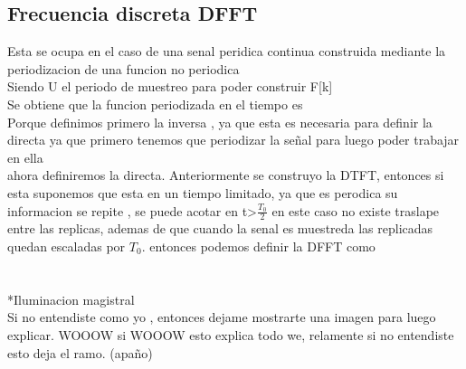 \subsection{ Frecuencia discreta DFFT}
Esta se ocupa en el caso de una senal peridica continua construida mediante la periodizacion de una funcion no periodica 
\\ Siendo U el periodo de muestreo para poder construir F[k]
\\ Se obtiene que la funcion periodizada en el tiempo es 
\\ Porque definimos primero la inversa , ya que esta es necesaria para definir la directa ya que primero tenemos que periodizar la señal para luego poder trabajar en ella
\\ ahora definiremos la directa. Anteriormente se construyo la DTFT, entonces si esta suponemos que esta en un tiempo limitado, ya que es perodica su informacion se repite , se puede acotar en t>$\frac{T_0}{2}$ en este caso no existe traslape entre las replicas, ademas de que cuando la senal es muestreda las replicadas quedan escaladas por $T_0$. entonces podemos definir la DFFT como \\ \\
\\ *Iluminacion magistral \\ Si no entendiste como yo , entonces  dejame mostrarte una imagen para luego explicar. 
WOOOW si  WOOOW esto explica todo we, relamente si no entendiste esto deja el ramo. (apaño)
\\\\\\ 
